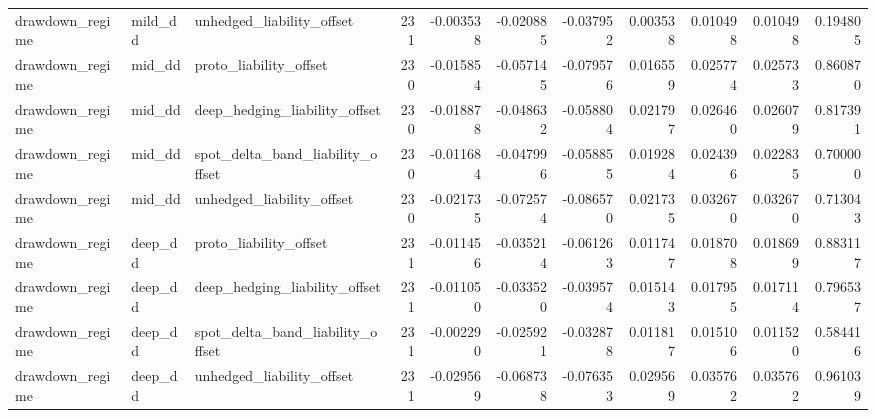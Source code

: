 \begin{tabular}{lllrrrrrrrr}
drawdown\_regime & mild\_dd & unhedged\_liability\_offset & 231 & -0.003538 & -0.020885 & -0.037952 & 0.003538 & 0.010498 & 0.010498 & 0.194805 \\
drawdown\_regime & mid\_dd & proto\_liability\_offset & 230 & -0.015854 & -0.057145 & -0.079576 & 0.016559 & 0.025774 & 0.025733 & 0.860870 \\
drawdown\_regime & mid\_dd & deep\_hedging\_liability\_offset & 230 & -0.018878 & -0.048632 & -0.058804 & 0.021797 & 0.026460 & 0.026079 & 0.817391 \\
drawdown\_regime & mid\_dd & spot\_delta\_band\_liability\_offset & 230 & -0.011684 & -0.047996 & -0.058855 & 0.019284 & 0.024396 & 0.022835 & 0.700000 \\
drawdown\_regime & mid\_dd & unhedged\_liability\_offset & 230 & -0.021735 & -0.072574 & -0.086570 & 0.021735 & 0.032670 & 0.032670 & 0.713043 \\
drawdown\_regime & deep\_dd & proto\_liability\_offset & 231 & -0.011456 & -0.035214 & -0.061263 & 0.011747 & 0.018708 & 0.018699 & 0.883117 \\
drawdown\_regime & deep\_dd & deep\_hedging\_liability\_offset & 231 & -0.011050 & -0.033520 & -0.039574 & 0.015143 & 0.017955 & 0.017114 & 0.796537 \\
drawdown\_regime & deep\_dd & spot\_delta\_band\_liability\_offset & 231 & -0.002290 & -0.025921 & -0.032878 & 0.011817 & 0.015106 & 0.011520 & 0.584416 \\
drawdown\_regime & deep\_dd & unhedged\_liability\_offset & 231 & -0.029569 & -0.068738 & -0.076353 & 0.029569 & 0.035762 & 0.035762 & 0.961039 \\
\bottomrule
\end{tabular}
